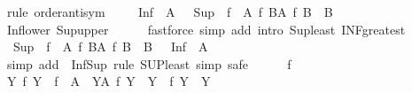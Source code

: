 \begin{isabellebody}
%
\isadelimproof
%
\endisadelimproof
%
\isatagproof
{}\isamarkupfalse%
\ {\isacharparenleft}{\kern0pt}rule\ order{\isachardot}{\kern0pt}antisym{\isacharparenright}{\kern0pt}\isanewline
\ \ \isamarkupfalse%
\ {\isachardoublequoteopen}{\isasymSqunion}\ {\isacharparenleft}{\kern0pt}Inf\ {\isacharbackquote}{\kern0pt}\ A{\isacharparenright}{\kern0pt}\ {\isasymle}\ {\isasymSqinter}\ {\isacharparenleft}{\kern0pt}Sup\ {\isacharbackquote}{\kern0pt}\ {\isacharbraceleft}{\kern0pt}f\ {\isacharbackquote}{\kern0pt}\ A\ {\isacharbar}{\kern0pt}f{\isachardot}{\kern0pt}\ {\isasymforall}B{\isasymin}A{\isachardot}{\kern0pt}\ f\ B\ {\isasymin}\ B{\isacharbraceright}{\kern0pt}{\isacharparenright}{\kern0pt}{\isachardoublequoteclose}\isanewline
\ \ \ \ \isamarkupfalse%
\ Inf{\isacharunderscore}{\kern0pt}lower{}\ Sup{\isacharunderscore}{\kern0pt}upper\isanewline
\ \ \ \ \isamarkupfalse%
\ {\isacharparenleft}{\kern0pt}fastforce\ simp\ add{\isacharcolon}{\kern0pt}\ intro{\isacharcolon}{\kern0pt}\ Sup{\isacharunderscore}{\kern0pt}least\ INF{\isacharunderscore}{\kern0pt}greatest{\isacharparenright}{\kern0pt}\isanewline
{}\isamarkupfalse%
\isanewline
\ \ \isamarkupfalse%
\ {\isachardoublequoteopen}{\isasymSqinter}\ {\isacharparenleft}{\kern0pt}Sup\ {\isacharbackquote}{\kern0pt}\ {\isacharbraceleft}{\kern0pt}f\ {\isacharbackquote}{\kern0pt}\ A\ {\isacharbar}{\kern0pt}f{\isachardot}{\kern0pt}\ {\isasymforall}B{\isasymin}A{\isachardot}{\kern0pt}\ f\ B\ {\isasymin}\ B{\isacharbraceright}{\kern0pt}{\isacharparenright}{\kern0pt}\ {\isasymle}\ {\isasymSqunion}\ {\isacharparenleft}{\kern0pt}Inf\ {\isacharbackquote}{\kern0pt}\ A{\isacharparenright}{\kern0pt}{\isachardoublequoteclose}\isanewline
\ \ \isamarkupfalse%
\ {\isacharparenleft}{\kern0pt}simp\ add{\isacharcolon}{\kern0pt}\ \ Inf{\isacharunderscore}{\kern0pt}Sup{\isacharcomma}{\kern0pt}\ rule\ SUP{\isacharunderscore}{\kern0pt}least{\isacharcomma}{\kern0pt}\ simp{\isacharcomma}{\kern0pt}\ safe{\isacharparenright}{\kern0pt}\isanewline
\ \ \ \ \isamarkupfalse%
\ f\isanewline
\ \ \ \ \isamarkupfalse%
\ {\isachardoublequoteopen}{\isasymforall}Y{\isachardot}{\kern0pt}\ {\isacharparenleft}{\kern0pt}{\isasymexists}f{\isachardot}{\kern0pt}\ Y\ {\isacharequal}{\kern0pt}\ f\ {\isacharbackquote}{\kern0pt}\ A\ {\isasymand}\ {\isacharparenleft}{\kern0pt}{\isasymforall}Y{\isasymin}A{\isachardot}{\kern0pt}\ f\ Y\ {\isasymin}\ Y{\isacharparenright}{\kern0pt}{\isacharparenright}{\kern0pt}\ {\isasymlongrightarrow}\ f\ Y\ {\isasymin}\ Y{\isachardoublequoteclose}\isanewline

\end{isabellebody}
